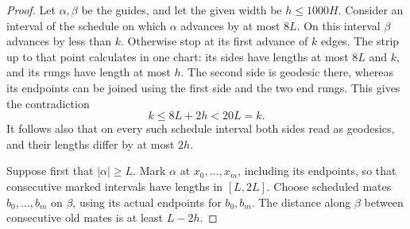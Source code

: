 \documentclass[11pt,reqno]{amsart}
\numberwithin{equation}{section}
\theoremstyle{definition}
\theoremstyle{remark}
\begin{document}
\begin{proof}
Let $\alpha,\beta$ be the guides, and let the given width be
$h\le1000H$.  Consider an interval of the schedule on which $\alpha$
advances by at most $8L$.  On this interval $\beta$ advances by less than
$k$.  Otherwise stop at its first advance of $k$ edges.  The strip up to
that point calculates in one chart: its sides have lengths at most
$8L$ and $k$, and its rungs have length at most $h$.  The second side is
geodesic there, whereas its endpoints can be joined using the first side
and the two end rungs.  This gives the contradiction
\[
 k\le8L+2h<20L=k.
\]
It follows also that on every such schedule interval both sides read as
geodesics, and their lengths differ by at most $2h$.

Suppose first that $|\alpha|\ge L$.  Mark $\alpha$ at
$x_0,\ldots,x_m$, including its endpoints, so that consecutive marked
intervals have lengths in $[L,2L]$.  Choose scheduled mates
$b_0,\ldots,b_m$ on $\beta$, using its actual endpoints for $b_0,b_m$.
The distance along $\beta$ between consecutive old mates is at least
$L-2h$.


\end{proof}
\end{document}

